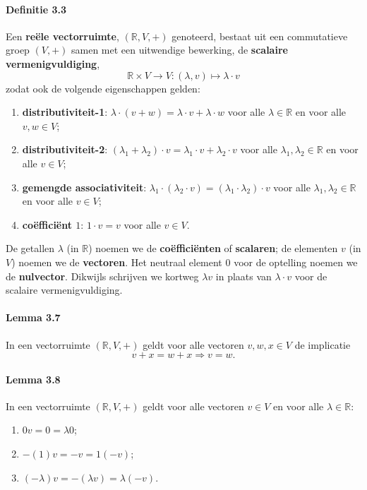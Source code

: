 \documentclass[11pt,oneside,a4paper]{article}
\begin{document}
	\paragraph{Definitie 3.3}
		Een \textbf{reële vectorruimte}, $(\mathbb{R}, V, +)$ genoteerd, bestaat uit een commutatieve groep $(V, +)$ samen met een uitwendige bewerking, de \textbf{scalaire vermenigvuldiging}, $$\mathbb{R} \times V \to V: (\lambda, v) \mapsto \lambda \cdot v$$ zodat ook de volgende eigenschappen gelden:
		\begin{enumerate}
			\item \textbf{distributiviteit-1}: $\lambda \cdot (v + w) = \lambda \cdot v + \lambda \cdot w$ voor alle $\lambda \in \mathbb{R}$ en voor alle $v, w \in V$;
			\item \textbf{distributiviteit-2}: $(\lambda_1 + \lambda_2)\cdot v= \lambda_1 \cdot v + \lambda_2 \cdot v$ voor alle $\lambda_1, \lambda_2 \in \mathbb{R}$ en voor alle $v \in V$;
			\item \textbf{gemengde associativiteit}: $\lambda_1 \cdot (\lambda_2 \cdot v)=(\lambda_1 \cdot \lambda_2) \cdot v$ voor alle $\lambda_1, \lambda_2 \in \mathbb{R}$ en voor alle $v \in V$;
			\item \textbf{coëfficiënt $1$}: $1 \cdot v = v$ voor alle $v \in V$.
		\end{enumerate}		
		De getallen $\lambda$ (in $\mathbb{R}$) noemen we de \textbf{coëfficiënten} of \textbf{scalaren}; de elementen $v$ (in $V$) noemen we de \textbf{vectoren}. Het neutraal element $0$ voor de optelling noemen we de \textbf{nulvector}. Dikwijls schrijven we kortweg $\lambda v$ in plaats van $\lambda \cdot v$ voor de scalaire vermenigvuldiging.
	\paragraph{Lemma 3.7}
		In een vectorruimte $(\mathbb{R}, V,+)$ geldt voor alle vectoren $v,w,x \in V$ de implicatie $$v+x=w+x \Rightarrow v=w.$$	
	\paragraph{Lemma 3.8}
		In een vectorruimte $(\mathbb{R}, V,+)$ geldt voor alle vectoren $v \in V$ en voor alle $\lambda \in \mathbb{R}$:
		\begin{enumerate}
			\item $0v = 0 = \lambda0$;
			\item $-(1)v = -v = 1(-v)$;
			\item $(-\lambda)v = -(\lambda v) = \lambda (-v)$.
		\end{enumerate}
\end{document}
